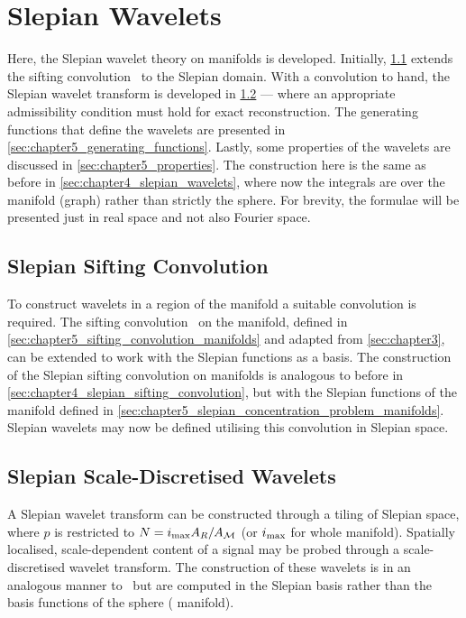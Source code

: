 \section{Slepian Wavelets}\label{sec:chapter5_slepian_wavelets}

Here, the Slepian wavelet theory on manifolds is developed.
Initially, \cref{sec:chapter5_slepian_sifting_convolution} extends the sifting convolution~\cite{Roddy2021} to the Slepian domain.
With a convolution to hand, the Slepian wavelet transform is developed in \cref{sec:chapter5_slepian_scale_discretised_wavelets} --- where an appropriate admissibility condition must hold for exact reconstruction.
The generating functions that define the wavelets are presented in \cref{sec:chapter5_generating_functions}.
Lastly, some properties of the wavelets are discussed in \cref{sec:chapter5_properties}.
The construction here is the same as before in \cref{sec:chapter4_slepian_wavelets}, where now the integrals are over the manifold (graph) rather than strictly the sphere.
For brevity, the formulae will be presented just in real space and not also Fourier space.

\subsection{Slepian Sifting Convolution}\label{sec:chapter5_slepian_sifting_convolution}

To construct wavelets in a region of the manifold a suitable convolution is required.
The sifting convolution~\cite{Roddy2021} on the manifold, defined in \cref{sec:chapter5_sifting_convolution_manifolds} and adapted from \cref{sec:chapter3}, can be extended to work with the Slepian functions as a basis.
The construction of the Slepian sifting convolution on manifolds is analogous to before in \cref{sec:chapter4_slepian_sifting_convolution}, but with the Slepian functions of the manifold defined in \cref{sec:chapter5_slepian_concentration_problem_manifolds}.
Slepian wavelets may now be defined utilising this convolution in Slepian space.

\subsection{Slepian Scale-Discretised Wavelets}\label{sec:chapter5_slepian_scale_discretised_wavelets}

A Slepian wavelet transform can be constructed through a tiling of Slepian space, where \(p\) is restricted to \(N=i_{\text{max}} A_{R}/A_{\mathcal{M}}\) (or \(i_{\text{max}}{}\) for whole manifold).
Spatially localised, scale-dependent content of a signal may be probed through a scale-discretised wavelet transform.
The construction of these wavelets is in an analogous manner to~\cite{Wiaux2008,McEwen2018} but are computed in the Slepian basis rather than the basis functions of the sphere (\cf{} manifold).

